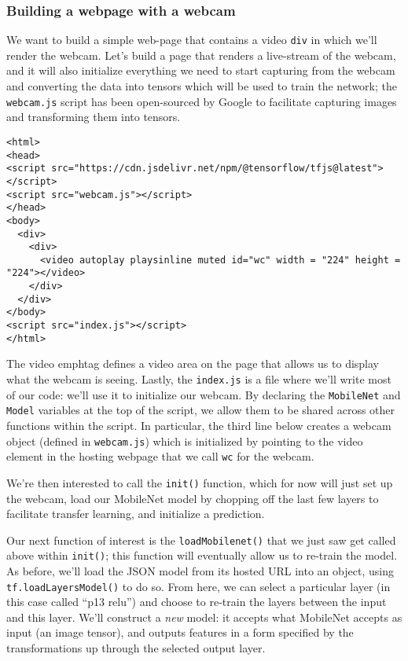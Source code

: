 \documentclass[12pt]{article}
\begin{document}
\subsubsection{Building a webpage with a webcam}
We want to build a simple web-page that contains a video \texttt{div} in which we'll render the webcam. Let's build a page that renders a live-stream of the webcam, and it will also initialize everything we need to start capturing from the webcam and converting the data into tensors which will be used to train the network; the \texttt{webcam.js} script has been open-sourced by Google to facilitate capturing images and transforming them into tensors.
\begin{verbatim}
<html>
<head>
<script src="https://cdn.jsdelivr.net/npm/@tensorflow/tfjs@latest"> </script>
<script src="webcam.js"></script>
</head>
<body>
  <div>
    <div>
      <video autoplay playsinline muted id="wc" width = "224" height = "224"></video>
    </div>
  </div>
</body>
<script src="index.js"></script>
</html>
\end{verbatim}
The video emph{tag} defines a video area on the page that allows us to display what the webcam is seeing. Lastly, the \texttt{index.js} is a file where we'll write most of our code: we'll use it to initialize our webcam. By declaring the \texttt{MobileNet} and \texttt{Model} variables at the top of the script, we allow them to be shared across other functions within the script. In particular, the third line below creates a webcam object (defined in \texttt{webcam.js}) which is initialized by pointing to the video element in the hosting webpage that we call \texttt{wc} for the webcam.

We're then interested to call the \texttt{init()} function, which for now will just set up the webcam, load our MobileNet model by chopping off the last few layers to facilitate transfer learning, and initialize a prediction.


Our next function of interest is the \texttt{loadMobilenet()} that we just saw get called above within \texttt{init()}; this function will eventually allow us to re-train the model. As before, we'll load the JSON model from its hosted URL into an object, using \texttt{tf.loadLayersModel()} to do so. From here, we can select a particular layer (in this case called ``p13 relu'') and choose to re-train the layers between the input and this layer. We'll construct a \emph{new} model: it accepts what MobileNet accepts as input (an image tensor), and outputs features in a form specified by the transformations up through the selected output layer.  

\end{document}
